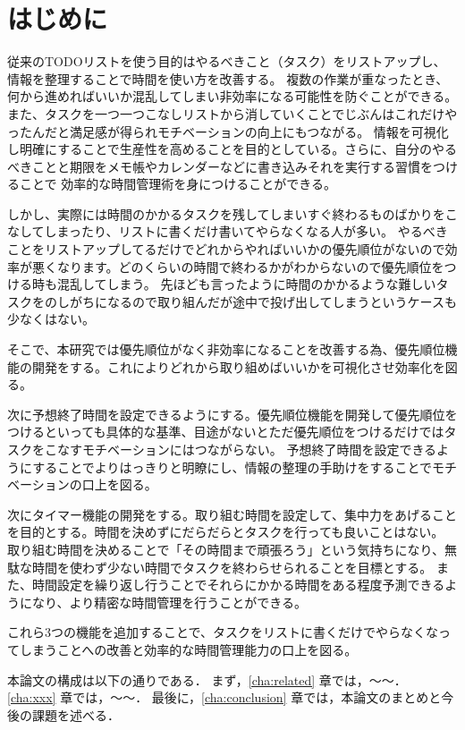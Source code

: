 \chapter{はじめに}
\label{cha:intro}

従来のTODOリストを使う目的はやるべきこと（タスク）をリストアップし、情報を整理することで時間を使い方を改善する。
複数の作業が重なったとき、何から進めればいいか混乱してしまい非効率になる可能性を防ぐことができる。
また、タスクを一つ一つこなしリストから消していくことでじぶんはこれだけやったんだと満足感が得られモチベーションの向上にもつながる。
情報を可視化し明確にすることで生産性を高めることを目的としている。さらに、自分のやるべきことと期限をメモ帳やカレンダーなどに書き込みそれを実行する習慣をつけることで
効率的な時間管理術を身につけることができる。

しかし、実際には時間のかかるタスクを残してしまいすぐ終わるものばかりをこなしてしまったり、リストに書くだけ書いてやらなくなる人が多い。
やるべきことをリストアップしてるだけでどれからやればいいかの優先順位がないので効率が悪くなります。どのくらいの時間で終わるかがわからないので優先順位をつける時も混乱してしまう。
先ほども言ったように時間のかかるような難しいタスクをのしがちになるので取り組んだが途中で投げ出してしまうというケースも少なくはない。

そこで、本研究では優先順位がなく非効率になることを改善する為、優先順位機能の開発をする。これによりどれから取り組めばいいかを可視化させ効率化を図る。

次に予想終了時間を設定できるようにする。優先順位機能を開発して優先順位をつけるといっても具体的な基準、目途がないとただ優先順位をつけるだけではタスクをこなすモチベーションにはつながらない。
予想終了時間を設定できるようにすることでよりはっきりと明瞭にし、情報の整理の手助けをすることでモチベーションの口上を図る。

次にタイマー機能の開発をする。取り組む時間を設定して、集中力をあげることを目的とする。時間を決めずにだらだらとタスクを行っても良いことはない。
取り組む時間を決めることで「その時間まで頑張ろう」という気持ちになり、無駄な時間を使わず少ない時間でタスクを終わらせられることを目標とする。
また、時間設定を繰り返し行うことでそれらにかかる時間をある程度予測できるようになり、より精密な時間管理を行うことができる。

これら3つの機能を追加することで、タスクをリストに書くだけでやらなくなってしまうことへの改善と効率的な時間管理能力の口上を図る。


本論文の構成は以下の通りである．
まず，\ref{cha:related} 章では，～～．
\ref{cha:xxx} 章では，～～．
最後に，\ref{cha:conclusion} 章では，本論文のまとめと今後の課題を述べる．